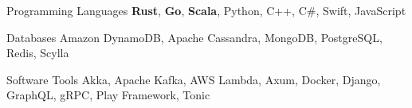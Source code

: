

\begin{cvskills}

  \cvskill
    {Programming Languages} %
    {{\bf Rust}, {\bf Go}, {\bf Scala}, Python, C++, C\#, Swift, JavaScript} %

  \cvskill
    {Databases} %
    {Amazon DynamoDB, Apache Cassandra, MongoDB, PostgreSQL, Redis, Scylla} %

  \cvskill
    {Software Tools} %
    {Akka, Apache Kafka, AWS Lambda, Axum, Docker, Django, GraphQL, gRPC, Play Framework, Tonic} %

\end{cvskills}
